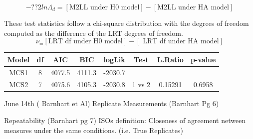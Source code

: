 \documentclass[12pt, a4paper]{report}
\theoremstyle{plain}
\theoremstyle{definition}
\theoremstyle{remark}
\begin{document}
\begin{equation}
-??2 ln \Lambda_d = [\mbox{M2LL under H0 model}] - [\mbox{M2LL under HA model}] 
\end{equation}

These test statistics follow a chi-square distribution with the degrees of freedom
computed as the difference of the LRT degrees of freedom.
\begin{equation}	
\nu_ = [ \mbox{LRT df under H0 model}] - [\mbox{ LRT df under HA model}]
\end{equation}	

%	
%	
%		
\begin{center}
	\begin{tabular}{|c|c|c|c|c|c|c|c|}
		\hline
		Model   &      df &   AIC  & BIC      & logLik & Test & L.Ratio & p-value \\ \hline
		MCS1    &       8 & 4077.5 & 4111.3 & -2030.7  &       &         &        \\ \hline
		MCS2    &       7 & 4075.6 & 4105.3 & -2030.8  & 1 vs 2 & 0.15291 & 0.6958 \\
		\hline 
	\end{tabular} 
\end{center}
 June 14th ( Barnhart et Al)
Replicate Measurements (Barnhart Pg 6)

Repeatability (Barnhart pg 7)
ISOs definition: Closeness of agreement netween measures under the same conditions. (i.e. True Replicates)
 
\end{document}

